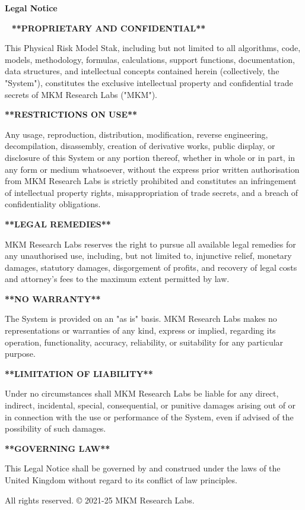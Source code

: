 \documentclass{article}
\begin{document}
\begin{center}
\large\textbf{Legal Notice}

\vspace{1em}
\
\noindent
\small
\textbf{**PROPRIETARY AND CONFIDENTIAL**}

This Physical Risk Model Stak, including but not limited to all algorithms, code, models, methodology, formulas, calculations, support functions, documentation, data structures, and intellectual concepts contained herein (collectively, the "System"), constitutes the exclusive intellectual property and confidential trade secrets of MKM Research Labs ("MKM").

\textbf{**RESTRICTIONS ON USE**}

Any usage, reproduction, distribution, modification, reverse engineering, decompilation, disassembly, creation of derivative works, public display, or disclosure of this System or any portion thereof, whether in whole or in part, in any form or medium whatsoever, without the express prior written authorisation from MKM Research Labs is strictly prohibited and constitutes an infringement of intellectual property rights, misappropriation of trade secrets, and a breach of confidentiality obligations.

\textbf{**LEGAL REMEDIES**}

MKM Research Labs reserves the right to pursue all available legal remedies for any unauthorised use, including, but not limited to, injunctive relief, monetary damages, statutory damages, disgorgement of profits, and recovery of legal costs and attorney's fees to the maximum extent permitted by law.

\textbf{**NO WARRANTY**}

The System is provided on an "as is" basis. MKM Research Labs makes no representations or warranties of any kind, express or implied, regarding its operation, functionality, accuracy, reliability, or suitability for any particular purpose.

\textbf{**LIMITATION OF LIABILITY**}

Under no circumstances shall MKM Research Labs be liable for any direct, indirect, incidental, special, consequential, or punitive damages arising out of or in connection with the use or performance of the System, even if advised of the possibility of such damages.

\textbf{**GOVERNING LAW**}

This Legal Notice shall be governed by and construed under the laws of the United Kingdom without regard to its conflict of law principles.


\vspace{1em}

\noindent All rights reserved. © 2021-25 MKM Research Labs.

\vspace{2em}
\end{center}
\clearpage
\end{document}
